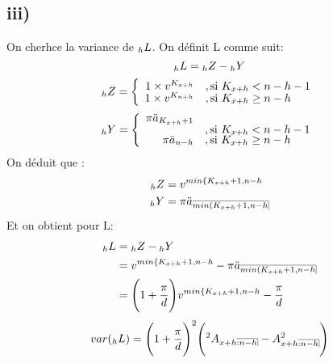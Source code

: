 \documentclass[11pt,french]{report}
\makeatletter
\DeclareRobustCommand{\annuity}[1]{%
\def\arraystretch{0}%
\setlength\arraycolsep{.7pt}%
\setlength\arrayrulewidth{.3pt}%
\begin{array}[b]{@{}c|}\hline
\\[\arraycolsep]%
\scriptstyle #1%
\end{array}%
}
\newcommand{\indiceGauche}[2]{{\vphantom{#2}}_{#1}#2}
\makeatother
\begin{document}
\subsection*{iii)}
On cherhce la variance de $\indiceGauche{h}{L}$.
On définit L comme suit:
\begin{equation}
\indiceGauche{h}{L} = \indiceGauche{h}{Z} - \indiceGauche{h}{Y}
\end{equation}
\begin{equation}
\indiceGauche{h}{Z} =
     	\left\{
     	\begin{array}{rl}
     	1\times v^{K_{x+h}} &, \text{si } K_{x+h} <n-h-1 \\
		 1\times  v^{K_{n+h}} &, \text{si } K_{x+h} \geq n-h \\
     	\end{array}
     	\right.	
\end{equation}
\begin{equation}
\indiceGauche{h}{Y} =
     	\left\{
     	\begin{array}{rl}
     	\pi \ddot{a}_{K_{x+h}+1}\\ &, \text{si } K_{x+h} <n-h-1 \\
		 \pi \ddot{a}_{n - h} &, \text{si } K_{x+h} \geq n-h \\
     	\end{array}
     	\right.	
\end{equation}
On déduit que :
\begin{align*}
\indiceGauche{h}{Z} &= v^{min\lbrace K_{x+h}+1, n-h}\\
\indiceGauche{h}{Y} &= \pi \ddot{a}_{\annuity{min(K_{x+h}+1, n-h}} \\
\end{align*}
Et on obtient pour L:
\begin{align*}
\indiceGauche{h}{L} &= \indiceGauche{h}{Z} - \indiceGauche{h}{Y}\\
&= v^{min\lbrace K_{x+h}+1, n-h} - \pi \ddot{a}_{\annuity{min(K_{x+h}+1, n-h}}\\
&= \Bigg(1 + \frac{\pi}{d}\Bigg)v^{min\lbrace K_{x+h}+1, n-h} - \frac{\pi}{d}\\
\end{align*}
\begin{equation}
var(\indiceGauche{h}{L}) = \Bigg(1 + \frac{\pi}{d}\Bigg)^2 \Bigg({}^2{A_{x+h\annuity{:n-h}}} - A_{x+h\annuity{:n-h}}^2\Bigg)
\end{equation}
\end{document}
